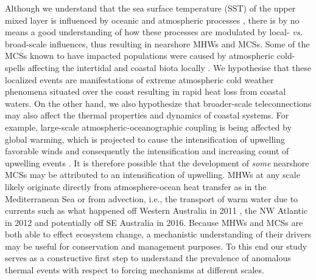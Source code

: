 \documentclass[a4paper,10pt,review]{elsarticle}
\begin{document}
Although we understand that the sea surface temperature (SST) of the upper mixed layer is influenced by oceanic and atmospheric processes \citep[see Equation 1 of][]{Deser2010}, there is by no means a good understanding of how these processes are modulated by local- \emph{vs.} broad-scale influences, thus resulting in nearshore MHWs and MCSs. Some of the MCSs known to have impacted populations were caused by atmospheric cold-spells affecting the intertidal and coastal biota locally \citep{Gunter1941, Firth2011}. We hypothesise that these localized events are manifestations of extreme atmospheric cold weather phenomena situated over the coast resulting in rapid heat loss from coastal waters. On the other hand, we also hypothesize that broader-scale teleconnections may also affect the thermal properties and dynamics of coastal systems. For example, large-scale atmospheric-oceanographic coupling is being affected by global warming, which is projected to cause the intensification of upwelling favorable winds and consequently the intensification and increasing count of upwelling events \citep[see][for a review of this and alternative hypotheses]{Garcia-Reyes2015}. It is therefore possible that the development of \emph{some} nearshore MCSs may be attributed to an intensification of upwelling. MHWs at any scale likely originate directly from atmosphere-ocean heat transfer as in the Mediterranean Sea \citep[e.g.][]{Garrabou2009} or from advection, i.e., the transport of warm water due to currents such as what happened off Western Australia in 2011 \citep{Feng2013, Benthuysen2014}, the NW Atlantic in 2012 \citep{Mills2012, Chen2014, Chen2015} and potentially off SE Australia in 2016. Because MHWs and MCSs are both able to effect ecosystem change, a mechanistic understanding of their drivers may be useful for conservation and management purposes. To this end our study serves as a constructive first step to understand the prevalence of anomalous thermal events with respect to forcing mechanisms at different scales.
\end{document}
